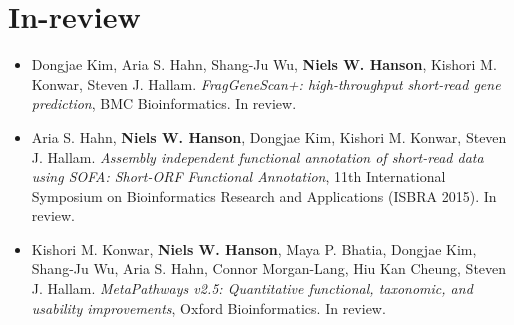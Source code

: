 \documentclass[print]{hanson_cv} %
\begin{document}
\section{In-review}
\begin{itemize}
\item
  Dongjae Kim, Aria S. Hahn, Shang-Ju Wu, \textbf{Niels W. Hanson}, Kishori M. Konwar, Steven J. Hallam. \emph{FragGeneScan+: high-throughput short-read gene prediction}, BMC Bioinformatics. In review.
\item
  Aria S. Hahn, \textbf{Niels W. Hanson}, Dongjae Kim, Kishori M. Konwar, Steven J. Hallam. \emph{Assembly independent functional annotation of short-read data using SOFA: Short-ORF Functional Annotation}, 11th International Symposium on Bioinformatics Research and Applications (ISBRA 2015). In review.
\item
  Kishori M. Konwar, \textbf{Niels W. Hanson}, Maya P. Bhatia, Dongjae Kim, Shang-Ju Wu, Aria S. Hahn, Connor Morgan-Lang, Hiu Kan Cheung, Steven J. Hallam. \emph{MetaPathways v2.5: Quantitative functional, taxonomic, and usability improvements}, Oxford Bioinformatics. In review.
\end{itemize}
\end{document}
